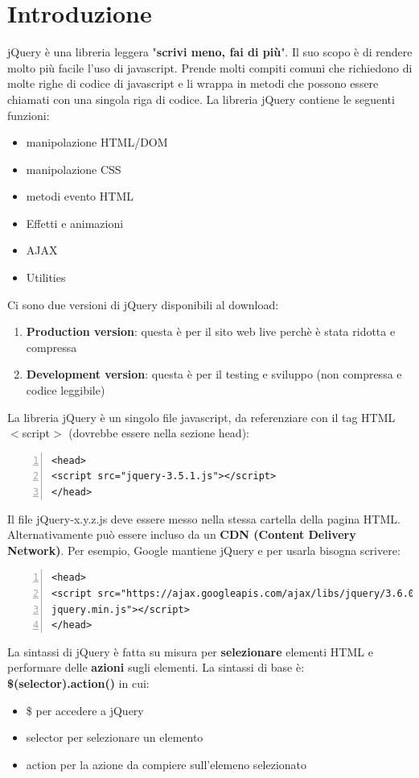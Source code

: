 \section{Introduzione}
jQuery è una libreria leggera "\textbf{scrivi meno, fai di più}". Il suo scopo è di rendere molto più facile l'uso di javascript. Prende molti compiti comuni che richiedono di molte righe di codice di javascript e li wrappa in metodi che possono essere chiamati con una singola riga di codice. La libreria jQuery contiene le seguenti funzioni:
\begin{itemize}
    \item manipolazione HTML/DOM
    \item manipolazione CSS
    \item metodi evento HTML
    \item Effetti e animazioni
    \item AJAX
    \item Utilities
\end{itemize}
Ci sono due versioni di jQuery disponibili al download:
\begin{enumerate}
    \item \textbf{Production version}: questa è per il sito web live perchè è stata ridotta e compressa
    \item \textbf{Development version}: questa è per il testing e sviluppo (non compressa e codice leggibile)
\end{enumerate}
La libreria jQuery è un singolo file javascript, da referenziare con il tag HTML $<$script$>$ (dovrebbe essere nella sezione head):
\begin{Verbatim}[frame = single, numbers = left]
<head>
<script src="jquery-3.5.1.js"></script>
</head>
\end{Verbatim}
Il file jQuery-x.y.z.js deve essere messo nella stessa cartella della pagina HTML. Alternativamente può essere incluso da un \textbf{CDN (Content Delivery Network)}. Per esempio, Google mantiene jQuery e per usarla bisogna scrivere:
\begin{Verbatim}[frame = single, numbers = left]
<head>
<script src="https://ajax.googleapis.com/ajax/libs/jquery/3.6.0/
jquery.min.js"></script>
</head>
\end{Verbatim}
La sintassi di jQuery è fatta su misura per \textbf{selezionare} elementi HTML e performare delle \textbf{azioni} sugli elementi. La sintassi di base è: \textbf{\$(selector).action()} in cui:
\begin{itemize}
    \item \$ per accedere a jQuery
    \item selector per selezionare un elemento
    \item action per la azione da compiere sull'elemeno selezionato
\end{itemize}
